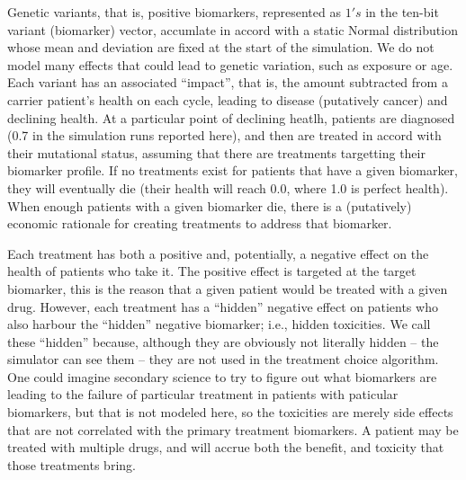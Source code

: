 \documentclass[12pt]{article}
\begin{document}
Genetic variants, that is, positive biomarkers, represented as $1's$
in the ten-bit variant (biomarker) vector, accumlate in accord with a
static Normal distribution whose mean and deviation are fixed at the
start of the simulation. We do not model many effects that could lead
to genetic variation, such as exposure or age. Each variant has an
associated ``impact'', that is, the amount subtracted from a carrier
patient's health on each cycle, leading to disease (putatively cancer)
and declining health. At a particular point of declining heatlh,
patients are diagnosed (0.7 in the simulation runs reported here), and
then are treated in accord with their mutational status, assuming that
there are treatments targetting their biomarker profile. If no
treatments exist for patients that have a given biomarker, they will
eventually die (their health will reach 0.0, where 1.0 is perfect
health). When enough patients with a given biomarker die, there is a
(putatively) economic rationale for creating treatments to address
that biomarker.

Each treatment has both a positive and, potentially, a negative effect
on the health of patients who take it. The positive effect is targeted
at the target biomarker, this is the reason that a given patient would
be treated with a given drug. However, each treatment has a ``hidden''
negative effect on patients who also harbour the ``hidden'' negative
biomarker; i.e., hidden toxicities. We call these ``hidden'' because,
although they are obviously not literally hidden -- the simulator can
see them -- they are not used in the treatment choice algorithm. One
could imagine secondary science to try to figure out what biomarkers
are leading to the failure of particular treatment in patients with
paticular biomarkers, but that is not modeled here, so the toxicities
are merely side effects that are not correlated with the primary
treatment biomarkers. A patient may be treated with multiple drugs,
and will accrue both the benefit, and toxicity that those treatments
bring.
\end{document}
